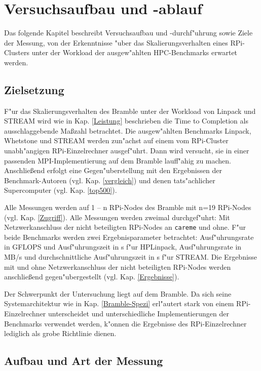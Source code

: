 \chapter{Versuchsaufbau und -ablauf}\label{Kapitel 3}
Das folgende Kapitel beschreibt Versuchsaufbau und -durchf"uhrung sowie Ziele der Messung, von der Erkenntnisse "uber das Skalierungsverhalten eines RPi-Clusters unter der Workload der ausgew"ahlten HPC-Benchmarks erwartet werden. 

\section{Zielsetzung}

F"ur das Skalierungsverhalten des Bramble unter der Workload von Linpack und STREAM wird wie in Kap. \ref{Leistung} beschrieben die Time to Completion als ausschlaggebende Ma\ss zahl betrachtet. Die ausgew"ahlten Benchmarks Linpack, Whetstone und STREAM werden zun"achst auf einem vom RPi-Cluster unabh"angigen RPi-Einzelrechner ausgef"uhrt. Dann wird versucht, sie in einer passenden MPI-Implementierung auf dem Bramble lauff"ahig zu machen. Anschlie\ss end erfolgt eine Gegen"uberstellung mit den Ergebnissen der Benchmark-Autoren (vgl. Kap. \ref{vergleich}) und denen tats"achlicher Supercomputer (vgl. Kap. \ref{top500}).

Alle Messungen werden auf 1 -- n RPi-Nodes des Bramble mit n=19 RPi-Nodes (vgl. Kap. \ref{Zugriff}). Alle Messungen werden zweimal durchgef"uhrt: Mit Netzwerkanschluss der nicht beteiligten RPi-Nodes an \texttt{careme} und ohne. F"ur beide Benchmarks werden zwei Ergebnisparameter betrachtet: Ausf"uhrungsrate in GFLOPS und Ausf"uhrungszeit in s f"ur HPLinpack, Ausf"uhrungsrate in MB/s und durchschnittliche Ausf"uhrungszeit in s f"ur STREAM. Die Ergebnisse mit und ohne Netzwerkanschluss der nicht beteiligten RPi-Nodes werden anschlie\ss end gegen"ubergestellt (vgl. Kap. \ref{Ergebnisse}). 

Der Schwerpunkt der Untersuchung liegt auf dem Bramble. Da sich seine Systemarchitektur wie in Kap. \ref{Bramble-Spezi} erl"autert stark von einem RPi-Einzelrechner unterscheidet und unterschiedliche Implementierungen der Benchmarks verwendet werden, k"onnen die Ergebnisse des RPi-Einzelrechner lediglich als grobe Richtlinie dienen.  

\section{Aufbau und Art der Messung}\label{Aufbau}

